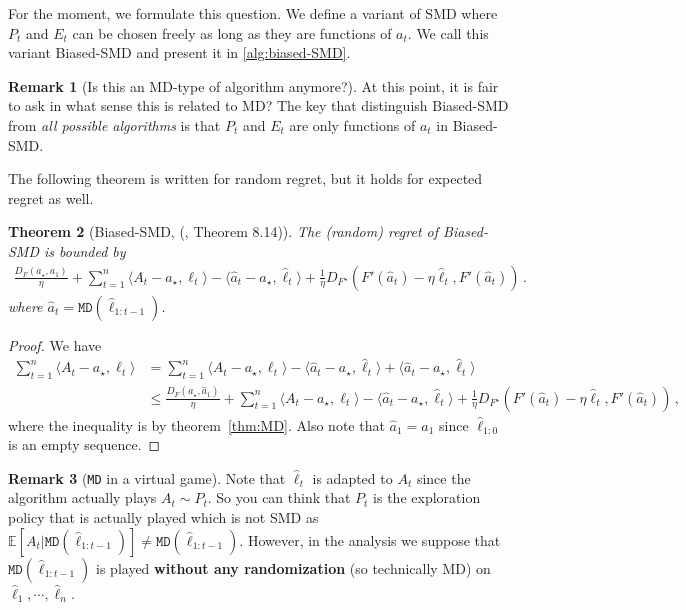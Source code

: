 \documentclass{article}
\theoremstyle{plain}
\newtheorem{theorem}{Theorem}
\theoremstyle{definition}
\newtheorem{remark}[theorem]{Remark}
\newcommand{\E}{\mathbb E}
\newcommand{\fmd}{\texttt{MD}}
\newcommand{\mdalg}{\textsf{MD}\xspace}
\newcommand{\smdalg}{\textsf{SMD}\xspace}
\newcommand{\hl}{\hat{\ell}\xspace}
\begin{document}
For the moment, we formulate this question.
We define a variant of \smdalg where $P_t$ and $E_t$
can be chosen freely as long as they are functions of $a_t$.
We call this variant Biased-\smdalg and present it in \cref{alg:biased-SMD}.
\begin{remark}[Is this an \mdalg-type of algorithm anymore?]
    At this point, it is fair to ask in what sense this is related
    to \mdalg? The key that distinguish Biased-\smdalg from
    \textit{all possible algorithms} is that $P_t$ and $E_t$
    are only functions of $a_t$ in Biased-\smdalg.
\end{remark}

The following theorem is written for random regret, but it holds for expected regret as well.
\begin{theorem}[Biased-\smdalg, (\cite{lattimore2024bandit}, Theorem 8.14)]\label{thm:SMD-biased}
    The (random) regret of Biased-\smdalg is bounded by
    \begin{align*}
        \frac{D_F(a_\star, a_1)}{\eta} +
        \sum_{t=1}^{n}
        \langle A_t - a_\star, \ell_t\rangle
        - \langle \hat{a}_t - a_\star, \hl_t\rangle
        + \frac{1}{\eta} D_{F^\star}(F'(\hat{a}_t) - \eta \hl_t, F'(\hat{a}_t))
        \,.
    \end{align*}
    where $\hat{a}_t = \fmd(\hl_{1:t-1})$.
\end{theorem}
\begin{proof}
    We have
    \begin{align*}
        \sum_{t=1}^{n}
        \langle A_t - a_\star, \ell_t\rangle
         & =
        \sum_{t=1}^{n}
        \langle A_t - a_\star, \ell_t\rangle
        - \langle \hat{a}_t - a_\star, \hl_t\rangle
        + \langle \hat{a}_t - a_\star, \hl_t\rangle
        \\
         & \leq
        \frac{D_F(a_\star, \hat{a}_1)}{\eta}
        +
        \sum_{t=1}^{n}
        \langle A_t - a_\star, \ell_t\rangle
        - \langle \hat{a}_t - a_\star, \hl_t\rangle
        + \frac{1}{\eta} D_{F^\star}(F'(\hat{a}_t) - \eta \hl_t, F'(\hat{a}_t))
        \,,
    \end{align*}
    where the inequality is by theorem~\ref{thm:MD}.
    Also note that $\hat{a}_1 = a_1$ since $\hl_{1:0}$ is an empty sequence.
\end{proof}
\begin{remark}[\fmd{} in a virtual game]
    Note that $\hl_t$ is adapted to $A_t$ since the algorithm actually plays
    $A_t \sim P_t$.
    So you can think that $P_t$ is the exploration policy that
    is actually played which is not \smdalg as
    $\E[A_t|\fmd(\hl_{1:t-1})] \neq \fmd(\hl_{1:t-1})$.
    However, in the analysis we suppose that $\fmd(\hl_{1:t-1})$ is played
    \textbf{without any randomization} (so technically \mdalg) on
    $\hl_1, \cdots, \hl_n$.
\end{remark}
\end{document}

